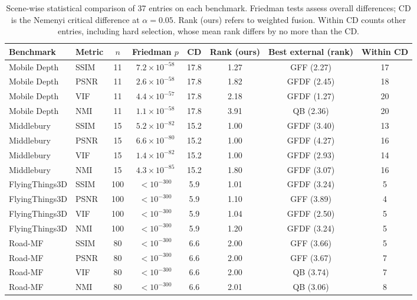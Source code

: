 \begin{table}[!htbp]
\centering
\scriptsize
\setlength{\tabcolsep}{3pt}
\caption{Scene-wise statistical comparison of 37 entries on each benchmark. Friedman tests assess overall differences; CD is the Nemenyi critical difference at $\alpha=0.05$. Rank (ours) refers to weighted fusion. Within CD counts other entries, including hard selection, whose mean rank differs by no more than the CD.}
\label{tab:stats}
\begin{tabular}{llcccccc}
\toprule
Benchmark & Metric & $n$ & Friedman $p$ & CD & Rank (ours) & Best external (rank) & Within CD \\
\midrule
Mobile Depth & SSIM & 11 & $7.2\times10^{-58}$ & 17.8 & 1.27 & GFF (2.27) & 17 \\
Mobile Depth & PSNR & 11 & $2.6\times10^{-58}$ & 17.8 & 1.82 & GFDF (2.45) & 18 \\
Mobile Depth & VIF & 11 & $4.4\times10^{-57}$ & 17.8 & 2.18 & GFDF (1.27) & 20 \\
Mobile Depth & NMI & 11 & $1.1\times10^{-58}$ & 17.8 & 3.91 & QB (2.36) & 20 \\
Middlebury & SSIM & 15 & $5.2\times10^{-82}$ & 15.2 & 1.00 & GFDF (3.40) & 13 \\
Middlebury & PSNR & 15 & $6.6\times10^{-80}$ & 15.2 & 1.00 & GFDF (4.27) & 16 \\
Middlebury & VIF & 15 & $1.4\times10^{-82}$ & 15.2 & 1.00 & GFDF (2.93) & 14 \\
Middlebury & NMI & 15 & $4.3\times10^{-85}$ & 15.2 & 1.80 & GFDF (3.07) & 16 \\
FlyingThings3D & SSIM & 100 & $<10^{-300}$ & 5.9 & 1.01 & GFDF (3.24) & 5 \\
FlyingThings3D & PSNR & 100 & $<10^{-300}$ & 5.9 & 1.10 & GFF (3.89) & 4 \\
FlyingThings3D & VIF & 100 & $<10^{-300}$ & 5.9 & 1.04 & GFDF (2.50) & 5 \\
FlyingThings3D & NMI & 100 & $<10^{-300}$ & 5.9 & 1.20 & GFDF (3.24) & 5 \\
Road-MF & SSIM & 80 & $<10^{-300}$ & 6.6 & 2.00 & GFF (3.66) & 5 \\
Road-MF & PSNR & 80 & $<10^{-300}$ & 6.6 & 2.00 & GFF (3.67) & 7 \\
Road-MF & VIF & 80 & $<10^{-300}$ & 6.6 & 2.00 & QB (3.74) & 7 \\
Road-MF & NMI & 80 & $<10^{-300}$ & 6.6 & 2.01 & QB (3.06) & 8 \\
\bottomrule
\end{tabular}
\end{table}
